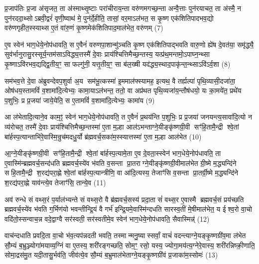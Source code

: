 प्र॒जाप॑तिः प्र॒जा अ॑सृजत॒ ता अ॑स्माथ्सृ॒ष्टाः परा॑चीराय॒न्ता वरु॑णमगच्छ॒न्ता अन्वै॒त्ताः पुन॑रयाचत॒ ता अ॑स्मै॒ न पुन॑रददा॒थ्सोऽब्रवी॒द्वरं॑ वृणी॒ष्वाथ॑ मे॒ पुन॑र्दे॒हीति॒ तासां॒ वर॒माऽल॑भत॒ स कृ॒ष्ण एक॑शितिपादभव॒द्यो वरु॑णगृहीत॒स्स्याथ्स ए॒तं वा॑रु॒णं कृ॒ष्णमेक॑शितिपाद॒माल॑भेत॒ वरु॑णम् (7)

ए॒व स्वेन॑ भाग॒धेये॒नोप॑धावति॒ स ए॒वैनं॑ वरुणपा॒शान्मु॑ञ्चति कृ॒ष्ण एक॑शितिपाद्भवति वारु॒णो ह्ये॑ष दे॒वत॑या॒ समृ॑द्ध्यै॒ सुव॑र्भानुरासु॒रस्सूर्य॒न्तम॑साऽविद्ध्य॒त्तस्मै॑ दे॒वाः प्राय॑श्चित्तिमैच्छ॒न्तस्य॒ यत्प्र॑थ॒मन्तमो॒ऽपाघ्न॒न्थ्सा कृ॒ष्णाऽवि॑रभव॒द्यद्द्वि॒तीय॒ꣳ॒ सा फल्गु॑नी॒ यत्तृ॒तीय॒ꣳ॒ सा ब॑ल॒ख्षी यद॑द्ध्य॒स्थाद॒पाकृ॑न्त॒न्थ्साऽवि॑ऽर्व॒शा (8)

सम॑भव॒त्ते दे॒वा अ॑ब्रुवन्देवप॒शुर्वा अ॒य सम॑भू॒त्कस्मा॑ इ॒ममाल॑फ्स्यामह॒ इत्यथ॒ वै तर्ह्यल्पा॑ पृथि॒व्यासी॒दजा॑ता॒ ओष॑धय॒स्तामविं॑ व॒शामा॑दि॒त्येभ्यः॒ कामा॒याऽल॑भन्त॒ ततो॒ वा अप्र॑थत पृथि॒व्यजा॑य॒न्तौष॑धयो॒ यः का॒मये॑त॒ प्रथे॑य प॒शुभिः॒ प्र प्र॒जया॑ जाये॒येति॒ स ए॒तामविं॑ व॒शामा॑दि॒त्येभ्यः॒ कामा॑य (9)

आ ल॑भेतादि॒त्याने॒व काम॒ꣵ॒ स्वेन॑ भाग॒धेये॒नोप॑धावति॒ त ए॒वैनं॑ प्र॒थय॑न्ति प॒शुभिः॒ प्र प्र॒जया॑ जनयन्त्य॒सावा॑दि॒त्यो न व्य॑रोचत॒ तस्मै॑ दे॒वाः प्राय॑श्चित्तिमैच्छ॒न्तस्मा॑ ए॒ता म॒ल्\mbox{}हा आल॑ऽभन्ताग्ने॒यीङ्कृ॑ष्णग्री॒वी सꣳ॑हि॒तामै॒न्द्री श्वे॒तां बा॑र्\mbox{}हस्प॒त्यान्ताभि॑रे॒वास्मि॒न्रुच॑मदधु॒र्यो ब्र॑ह्मवर्च॒सका॑म॒स्स्यात्तस्मा॑ ए॒ता म॒ल्\mbox{}हा आल॑भेत (10)

आ॒ग्ने॒यीङ्कृ॑ष्णग्री॒वी सꣳ॑हि॒तामै॒न्द्री श्वे॒तां बा॑र्\mbox{}हस्प॒त्यामे॒ता ए॒व दे॒वता॒स्स्वेन॑ भाग॒धेये॒नोप॑धावति॒ ता ए॒वास्मि॑न्ब्रह्मवर्च॒सन्द॑धति ब्रह्मवर्च॒स्ये॑व भ॑वति व॒सन्ता प्रा॒तराग्ने॒यीङ्कृ॑ष्णग्री॒वीमाल॑भेत ग्री॒ष्मे म॒द्ध्यन्दि॑ने सहि॒तामै॒न्द्री श॒रद्य॑परा॒ह्णे श्वे॒तां बा॑र्\mbox{}हस्प॒त्यान्त्रीणि॒ वा आ॑दि॒त्यस्य॒ तेजाꣳ॑सि व॒सन्ता प्रा॒तर्ग्री॒ष्मे म॒द्ध्यन्दि॑ने श॒रद्य॑परा॒ह्णे याव॑न्त्ये॒व तेजाꣳ॑सि॒ तान्ये॒व (11)

अव॑ रुन्धे सं वथ्स॒रं प॒र्याल॑भ्यन्ते सं वथ्स॒रो वै ब्र॑ह्मवर्च॒सस्य॑ प्रदा॒ता सं॑ वथ्स॒र ए॒वास्मै ब्रह्मवर्च॒सं प्रय॑च्छति ब्रह्मवर्च॒स्ये॑व भ॑वति ग॒र्भिण॑यो भवन्तीन्द्रि॒यं वै गर्भ॑ इन्द्रि॒यमे॒वास्मि॑न्दधति सारस्व॒तीं मे॒षीमाल॑भेत॒ य ईश्व॒रो वा॒चो वदि॑तो॒स्सन्वाच॒न्न वदे॒द्वाग्वै सर॑स्वती॒ सर॑स्वतीमे॒व स्वेन॑ भाग॒धेये॒नोप॑धावति॒ सैवास्मिन्न्॑ (12)

वाच॑न्दधाति प्रवदि॒ता वा॒चो भ॑व॒त्यप॑न्नदती भवति॒ तस्मान्मनु॒ष्यास्सर्वां॒ वाचं॑ वदन्त्याग्ने॒यङ्कृ॒ष्णग्री॑व॒मा ल॑भेत सौ॒म्यं ब॒भ्रुञ्ज्योगा॑मयाव्य॒ग्निं वा ए॒तस्य॒ शरी॑रङ्गच्छति॒ सोम॒ꣳ॒ रसो॒ यस्य॒ ज्योगा॒मय॑त्य॒ग्नेरे॒वास्य॒ शरी॑रन्निष्क्री॒णाति॒ सोमा॒द्रस॑मु॒त यदी॒तासु॒र्भव॑ति॒ जीव॑त्ये॒व सौ॒म्यं ब॒भ्रुमाल॑भेताग्ने॒यङ्कृ॒ष्णग्री॑वं प्र॒जाका॑म॒स्सोमः॑ (13)

